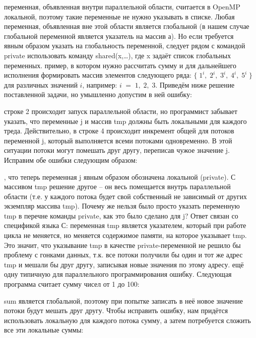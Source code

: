 {	 переменная, объявленная внутри параллельной области, считается в OpenMP локальной, поэтому такие переменные не нужно указывать в списке. Любая переменная, объявленная вне этой области является глобальной (в нашем случае глобальной переменной является указатель на массив $а$). Но если требуется явным образом указать на глобальность переменной, следует рядом с командой private использовать команду shared(x,\ldots), где x задаёт список глобальных переменных.
	 пример, в котором нужно рассчитать сумму и для дальнейшего исполнения формировать массив элементов следующего ряда: $\{\;1^i,\;2^i,\;3^i,\;4^i,\;5^i\;\}$ для различных значений $i$, например: $i\;=\;1,\;2,\;3$. Приведём ниже решение поставленной задачи, но умышленно допустим в ней ошибку:
	\begin{figure}[H]
		
	\end{figure}
	 строке 2 происходит запуск параллельной области, но программист забывает указать, что переменные j и массив tmp должны быть локальными для каждого треда. Действительно, в строке 4 происходит инкремент общей для потоков переменной j, который выполняется всеми потоками одновременно. В этой ситуации потоки могут помешать друг другу, переписав чужое значение j. Исправим обе ошибки следующим образом:
	\begin{figure}[H]
		
	\end{figure}
	, что теперь переменная j явным образом обозначена локальной (private). С массивом tmp решение другое – он весь помещается внутрь параллельной области (т.е. у каждого потока будет свой собственный не зависимый от других экземпляр массива tmp). Почему же нельзя было просто указать переменную tmp в перечне команды private, как это было сделано для j? Ответ связан со спецификой языка С: переменная tmp является указателем, который при работе цикла не меняется, но меняется содержимое памяти, на которое указывает tmp. Это значит, что указывание tmp в качестве private-переменной не решило бы проблему с гонками данных, т.к. все потоки получили бы один и тот же адрес tmp и мешали бы друг другу, записывая новые значения по этому адресу.
	 ещё одну типичную для параллельного программирования ошибку. Следующая программа считает сумму чисел от 1 до 100:
	\begin{figure}[H]
		
	\end{figure}
	 sum является глобальной, поэтому при попытке записать в неё новое значение потоки будут мешать друг другу. Чтобы исправить ошибку, нам придётся использовать локальную для каждого потока сумму, а затем потребуется сложить все эти локальные суммы:
}

